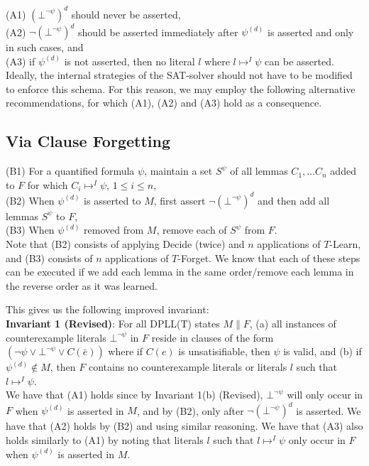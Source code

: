 \documentclass{llncs}
\begin{document}
\noindent (A1) $(\bot^{\neg \psi})^d$ should never be asserted, \\
(A2) $\neg (\bot^{\neg \psi})^d$ should be asserted immediately after $\psi^{(d)}$ is asserted and only in such cases, and \\
(A3) if $\psi^{(d)}$ is not asserted, then no literal $l$ where $l \mapsto^I \psi$ can be asserted. \\

Ideally, the internal strategies of the SAT-solver should not have to be modified to enforce this schema.
For this reason, we may employ the following alternative recommendations, for which (A1), (A2) and (A3) hold as a consequence.

\subsection{Via Clause Forgetting}

\noindent (B1) For a quantified formula $\psi$, maintain a set $S^\psi$ of all lemmas $C_1, \ldots C_n$ added to $F$ for which $C_i \mapsto^I \psi$, $1 \leq i \leq n$, \\
(B2) When $\psi^{(d)}$ is asserted to $M$, first assert $\neg (\bot^{\neg \psi})^d$ and then add all lemmas $S^\psi$ to $F$, \\
(B3) When $\psi^{(d)}$ removed from $M$, remove each of $S^\psi$ from $F$. \\

Note that (B2) consists of applying Decide (twice) and $n$ applications of $T$-Learn, and (B3) consists of $n$ applications of $T$-Forget.
We know that each of these steps can be executed if we add each lemma in the same order/remove each lemma in the reverse order as it was learned.

This gives us the following improved invariant: \\

{\bf Invariant 1 (Revised)}:
For all DPLL(T) states $M \parallel F$,
(a) all instances of counterexample literals $\bot^{\neg \psi}$ in $F$ reside in clauses of the form $( \neg \psi \vee \bot^{\neg \psi} \vee C(\bar{e}) )$ where if $C(e)$ is unsatisifiable, then $\psi$ is valid, and
(b) if $\psi^{(d)} \not\in M$, then $F$ contains no counterexample literals or literals $l$ such that $l \mapsto^I \psi$. \\

We have that (A1) holds since by Invariant 1(b) (Revised), $\bot^{\neg \psi}$ will only occur in $F$ when $\psi^{(d)}$ is asserted in $M$, and by (B2), only after $\neg (\bot^{\neg \psi})^d$ is asserted.
We have that (A2) holds by (B2) and using similar reasoning.
We have that (A3) also holds similarly to (A1) by noting that literals $l$ such that $l \mapsto^I \psi$ only occur in $F$ when $\psi^{(d)}$ is asserted in $M$.
\end{document}
